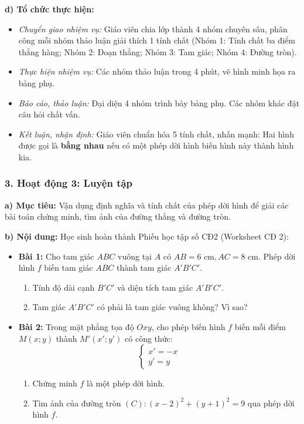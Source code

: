 \documentclass[12pt, a4paper]{article}
\begin{document}
\textbf{d) Tổ chức thực hiện:}
\begin{itemize}[leftmargin=0.6cm]
    \item \textit{Chuyển giao nhiệm vụ:} Giáo viên chia lớp thành 4 nhóm chuyên sâu, phân công mỗi nhóm thảo luận giải thích 1 tính chất (Nhóm 1: Tính chất ba điểm thẳng hàng; Nhóm 2: Đoạn thẳng; Nhóm 3: Tam giác; Nhóm 4: Đường tròn).
    \item \textit{Thực hiện nhiệm vụ:} Các nhóm thảo luận trong 4 phút, vẽ hình minh họa ra bảng phụ.
    \item \textit{Báo cáo, thảo luận:} Đại diện 4 nhóm trình bày bảng phụ. Các nhóm khác đặt câu hỏi chất vấn.
    \item \textit{Kết luận, nhận định:} Giáo viên chuẩn hóa 5 tính chất, nhấn mạnh: Hai hình được gọi là \textbf{bằng nhau} nếu có một phép dời hình biến hình này thành hình kia.
\end{itemize}

\subsubsection*{3. Hoạt động 3: Luyện tập}
\textbf{a) Mục tiêu:} Vận dụng định nghĩa và tính chất của phép dời hình để giải các bài toán chứng minh, tìm ảnh của đường thẳng và đường tròn.

\textbf{b) Nội dung:} Học sinh hoàn thành Phiếu học tập số CĐ2 (Worksheet CĐ 2):
\begin{itemize}[leftmargin=0.6cm]
    \item \textbf{Bài 1:} Cho tam giác $ABC$ vuông tại $A$ có $AB = 6\text{ cm}, AC = 8\text{ cm}$. Phép dời hình $f$ biến tam giác $ABC$ thành tam giác $A'B'C'$.
    \begin{enumerate}[leftmargin=0.5cm]
        \item Tính độ dài cạnh $B'C'$ và diện tích tam giác $A'B'C'$.
        \item Tam giác $A'B'C'$ có phải là tam giác vuông không? Vì sao?
    \end{enumerate}
    \item \textbf{Bài 2:} Trong mặt phẳng tọa độ $Oxy$, cho phép biến hình $f$ biến mỗi điểm $M(x; y)$ thành $M'(x'; y')$ có công thức:
    $$\begin{cases} x' = -x \\ y' = y \end{cases}$$
    \begin{enumerate}[leftmargin=0.5cm]
        \item Chứng minh $f$ là một phép dời hình.
        \item Tìm ảnh của đường tròn $(C): (x - 2)^2 + (y + 1)^2 = 9$ qua phép dời hình $f$.
    \end{enumerate}
\end{itemize}
\end{document}
